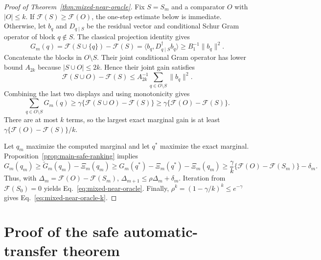 \documentclass[11pt]{article}
\numberwithin{algorithm}{section}
\theoremstyle{definition}\newtheorem{definition}[theorem]{Definition}
\theoremstyle{remark}\newtheorem{remark}[theorem]{Remark}
\begin{document}
\begin{proof}[Proof of Theorem~\ref{thm:mixed-near-oracle}]
Fix $S=S_m$ and a comparator $O$ with $|O|\leq k$.  If
$\mathcal F(S)\geq\mathcal F(O)$, the one-step estimate below is immediate.
Otherwise, let $b_q$ and $D_{q\mid S}$ be the residual vector and conditional
Schur Gram operator of block $q\notin S$.  The classical projection identity
gives
\[
 G_m(q)=\mathcal F(S\cup\{q\})-\mathcal F(S)
 =\langle b_q,D_{q\mid S}^{\dagger}b_q\rangle
 \geq B_1^{-1}\|b_q\|^2.
\]
Concatenate the blocks in $O\setminus S$.  Their joint conditional Gram
operator has lower bound $A_{2k}$ because
$|S\cup O|\leq2k$.  Hence their joint gain satisfies
\[
 \mathcal F(S\cup O)-\mathcal F(S)
 \leq A_{2k}^{-1}\sum_{q\in O\setminus S}\|b_q\|^2.
\]
Combining the last two displays and using monotonicity gives
\[
 \sum_{q\in O\setminus S}G_m(q)
 \geq\gamma\{\mathcal F(S\cup O)-\mathcal F(S)\}
 \geq\gamma\{\mathcal F(O)-\mathcal F(S)\}.
\]
There are at most $k$ terms, so the largest exact marginal gain is at least
$\gamma\{\mathcal F(O)-\mathcal F(S)\}/k$.

Let $q_m$ maximize the computed marginal and let $q^*$ maximize the exact
marginal.  Proposition~\ref{prop:main-safe-ranking} implies
\[
 G_m(q_m)\geq \widetilde G_m(q_m)-\Xi_m(q_m)
 \geq G_m(q^*)-\Xi_m(q^*)-\Xi_m(q_m)
 \geq \frac{\gamma}{k}
       \{\mathcal F(O)-\mathcal F(S_m)\}-\delta_m.
\]
Thus, with $\Delta_m=\mathcal F(O)-\mathcal F(S_m)$,
$\Delta_{m+1}\leq\rho\Delta_m+\delta_m$.  Iteration from
$\mathcal F(S_0)=0$ yields Eq.~\eqref{eq:mixed-near-oracle}.  Finally,
$\rho^k=(1-\gamma/k)^k\leq e^{-\gamma}$ gives
Eq.~\eqref{eq:mixed-near-oracle-k}.
\end{proof}

\section{Proof of the safe automatic-transfer theorem}
\label{app:safe-transfer-proof}
\end{document}

